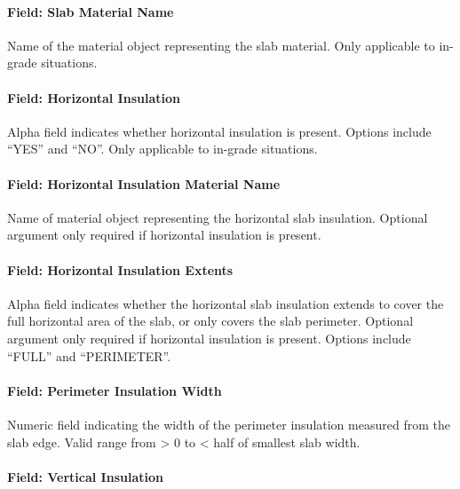 \paragraph{Field: Slab Material Name}\label{field-slab-material-name}

Name of the material object representing the slab material. Only applicable to in-grade situations.

\paragraph{Field: Horizontal Insulation}\label{field-horizontal-insulation}

Alpha field indicates whether horizontal insulation is present. Options include ``YES'' and ``NO''. Only applicable to in-grade situations.

\paragraph{Field: Horizontal Insulation Material Name}\label{field-horizontal-insulation-material-name}

Name of material object representing the horizontal slab insulation. Optional argument only required if horizontal insulation is present.

\paragraph{Field: Horizontal Insulation Extents}\label{field-horizontal-insulation-extents}

Alpha field indicates whether the horizontal slab insulation extends to cover the full horizontal area of the slab, or only covers the slab perimeter. Optional argument only required if horizontal insulation is present. Options include ``FULL'' and ``PERIMETER''.

\paragraph{Field: Perimeter Insulation Width}\label{field-perimeter-insulation-width}

Numeric field indicating the width of the perimeter insulation measured from the slab edge. Valid range from \textgreater{} 0 to \textless{} half of smallest slab width.

\paragraph{Field: Vertical Insulation}\label{field-vertical-insulation}

